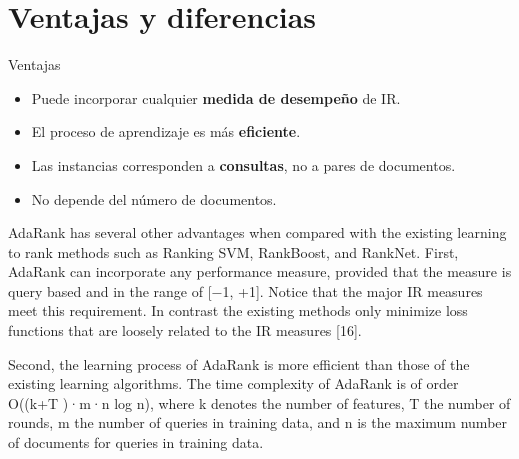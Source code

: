 \documentclass{beamer}
\begin{document}
\section{Ventajas y diferencias}
\begin{frame}{Ventajas}
    \begin{itemize}
        \item Puede incorporar cualquier \textbf{medida de desempeño} de IR.
        \item El proceso de aprendizaje es más \textbf{eficiente}.
        \item Las instancias corresponden a \textbf{consultas}, no a pares de documentos.
        \item No depende del número de documentos.
    \end{itemize}

    \begin{note}
        {AdaRank has several other advantages when compared with the existing learning to rank methods such as Ranking SVM, RankBoost, and RankNet. First, AdaRank can incorporate any performance measure, provided that the measure is query based and in the range of [−1, +1]. Notice that the major IR measures meet this requirement. In contrast the existing methods only minimize loss functions that are loosely related to the IR measures [16]. 

        Second, the learning process of AdaRank is more efficient than those of the existing learning algorithms. The time complexity of
        AdaRank is of order O((k+T )·m·n log n), where k denotes the number of features, T the number of rounds, m the number of queries in training data, and n is the maximum number of documents for queries in training data.
        
}
\end{note}
\end{frame}
\end{document}
